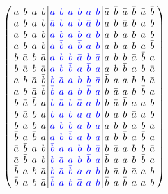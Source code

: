 \documentclass{beamer}
\newcommand{\bblue}[1]{\textcolor{blue}{#1}}
\begin{document}
\begin{frame}

  \[
    \arraycolsep=2.0pt\def\arraystretch{0.75}
    \left(
      \begin{array}{cccc|cccccc|cccccc}
        a&b&a&b&\bblue{a}&\bblue{b}&\bblue{a}&\bblue{b}&\bblue{a}&\bblue{b}&\bar{a}&\bar{b}&\bar{a}&\bar{b}&\bar{a}&\bar{b}\\
        a&b&a&b&\bblue{\bar{a}}&\bblue{\bar{b}}&\bblue{a}&\bblue{b}&\bblue{\bar{a}}&\bblue{\bar{b}}&a&b&\bar{a}&\bar{b}&a&b\\
        a&b&a&b&\bblue{a}&\bblue{b}&\bblue{\bar{a}}&\bblue{\bar{b}}&\bblue{\bar{a}}&\bblue{\bar{b}}&\bar{a}&\bar{b}&a&b&a&b\\
        a&b&a&b&\bblue{\bar{a}}&\bblue{\bar{b}}&\bblue{\bar{a}}&\bblue{\bar{b}}&\bblue{a}&\bblue{b}&a&b&a&b&\bar{a}&\bar{b}\\
        b&\bar{a}&b&\bar{a}&\bblue{a}&\bblue{b}&\bblue{b}&\bblue{\bar{a}}&\bblue{b}&\bblue{\bar{a}}&a&b&b&\bar{a}&\bar{b}&a\\
        b&\bar{a}&b&\bar{a}&\bblue{a}&\bblue{b}&\bblue{\bar{b}}&\bblue{a}&\bblue{\bar{b}}&\bblue{a}&a&b&\bar{b}&a&b&\bar{a}\\
        a&b&\bar{a}&\bar{b}&\bblue{b}&\bblue{\bar{a}}&\bblue{a}&\bblue{b}&\bblue{b}&\bblue{\bar{a}}&\bar{b}&a&a&b&b&\bar{a}\\
        a&b&\bar{a}&\bar{b}&\bblue{\bar{b}}&\bblue{a}&\bblue{a}&\bblue{b}&\bblue{\bar{b}}&\bblue{a}&b&\bar{a}&a&b&\bar{b}&a\\
        b&\bar{a}&\bar{b}&a&\bblue{b}&\bblue{\bar{a}}&\bblue{b}&\bblue{\bar{a}}&\bblue{a}&\bblue{b}&b&\bar{a}&\bar{b}&a&a&b\\
        b&\bar{a}&\bar{b}&a&\bblue{\bar{b}}&\bblue{a}&\bblue{\bar{b}}&\bblue{a}&\bblue{a}&\bblue{b}&\bar{b}&a&b&\bar{a}&a&b\\
        \bar{b}&a&\bar{b}&a&\bblue{a}&\bblue{b}&\bblue{b}&\bblue{\bar{a}}&\bblue{\bar{b}}&\bblue{a}&a&b&b&\bar{a}&b&\bar{a}\\
        \bar{b}&a&\bar{b}&a&\bblue{a}&\bblue{b}&\bblue{\bar{b}}&\bblue{a}&\bblue{b}&\bblue{\bar{a}}&a&b&\bar{b}&a&\bar{b}&a\\
        \bar{a}&\bar{b}&a&b&\bblue{\bar{b}}&\bblue{a}&\bblue{a}&\bblue{b}&\bblue{b}&\bblue{\bar{a}}&b&\bar{a}&a&b&b&\bar{a}\\
        \bar{a}&\bar{b}&a&b&\bblue{b}&\bblue{\bar{a}}&\bblue{a}&\bblue{b}&\bblue{\bar{b}}&\bblue{a}&\bar{b}&a&a&b&\bar{b}&a\\
        \bar{b}&a&b&\bar{a}&\bblue{b}&\bblue{\bar{a}}&\bblue{\bar{b}}&\bblue{a}&\bblue{a}&\bblue{b}&b&\bar{a}&b&\bar{a}&a&b\\
        \bar{b}&a&b&\bar{a}&\bblue{\bar{b}}&\bblue{a}&\bblue{b}&\bblue{\bar{a}}&\bblue{a}&\bblue{b}&\bar{b}&a&\bar{b}&a&a&b\\
      \end{array}
    \right)
  \]

\end{frame}
\end{document}
